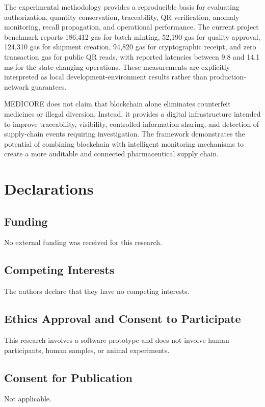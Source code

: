 \documentclass[11pt,a4paper]{article}
\begin{document}
The experimental methodology provides a reproducible basis for evaluating authorization, quantity conservation, traceability, QR verification, anomaly monitoring, recall propagation, and operational performance. The current project benchmark reports 186,412 gas for batch minting, 52,190 gas for quality approval, 124,310 gas for shipment creation, 94,820 gas for cryptographic receipt, and zero transaction gas for public QR reads, with reported latencies between 9.8 and 14.1 ms for the state-changing operations. These measurements are explicitly interpreted as local development-environment results rather than production-network guarantees.

MEDICORE does not claim that blockchain alone eliminates counterfeit medicines or illegal diversion. Instead, it provides a digital infrastructure intended to improve traceability, visibility, controlled information sharing, and detection of supply-chain events requiring investigation. The framework demonstrates the potential of combining blockchain with intelligent monitoring mechanisms to create a more auditable and connected pharmaceutical supply chain.

\section*{Declarations}

\subsection*{Funding}
No external funding was received for this research.

\subsection*{Competing Interests}
The authors declare that they have no competing interests.

\subsection*{Ethics Approval and Consent to Participate}
This research involves a software prototype and does not involve human participants, human samples, or animal experiments.

\subsection*{Consent for Publication}
Not applicable.
\end{document}
